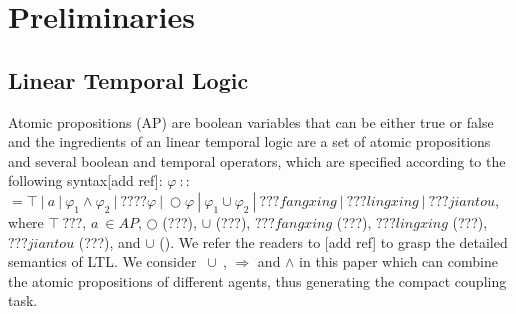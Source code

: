 \documentclass[journal]{IEEEtran}
\begin{document}
%


\section{Preliminaries}

\subsection{Linear Temporal Logic}
Atomic propositions (AP) are boolean variables that can be either true or false and the ingredients of an linear temporal logic are a set of atomic propositions and several boolean and temporal operators, which are specified according to the following syntax[add ref]: $\varphi\ $$:$$:$$=\top\ |\ a\ |\ \varphi_1\wedge\varphi_2\ |\ ????\varphi\ |\ \bigcirc\varphi\ |\ \varphi_1\cup\varphi_2\ |\ ???fangxing\ |\ ???lingxing\ |\ ???jiantou$, where $\top\ ???$, $a\ \in AP$, $\bigcirc$ (???), $\cup$ (???), $ ???fangxing$ (???),  $??? lingxing$ (???), $???jiantou$ (???), and $\cup$ (). We refer the readers to [add ref] to grasp the detailed semantics of LTL. We consider $\ \cup\ $, $\Longrightarrow$ and $\wedge$ in this paper which can combine the atomic propositions of different agents, thus generating the compact coupling task.
\end{document}
